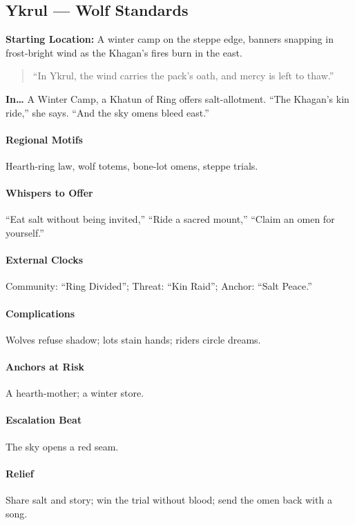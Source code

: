 \subsection*{Ykrul — Wolf Standards}
\textbf{Starting Location:} A winter camp on the steppe edge, banners snapping in frost‑bright wind as the Khagan’s fires burn in the east.
\begin{quote}
“In Ykrul, the wind carries the pack’s oath, and mercy is left to thaw.”
\end{quote}

\textbf{In…} A Winter Camp, a Khatun of Ring offers salt-allotment. ``The Khagan’s kin ride,'' she says. ``And the sky omens bleed east.''
\paragraph{Regional Motifs} Hearth-ring law, wolf totems, bone-lot omens, steppe trials.
\paragraph{Whispers to Offer} ``Eat salt without being invited,'' ``Ride a sacred mount,'' ``Claim an omen for yourself.''
\paragraph{External Clocks} Community: ``Ring Divided''; Threat: ``Kin Raid''; Anchor: ``Salt Peace.''
\paragraph{Complications} Wolves refuse shadow; lots stain hands; riders circle dreams.
\paragraph{Anchors at Risk} A hearth-mother; a winter store.
\paragraph{Escalation Beat} The sky opens a red seam.
\paragraph{Relief} Share salt and story; win the trial without blood; send the omen back with a song.
